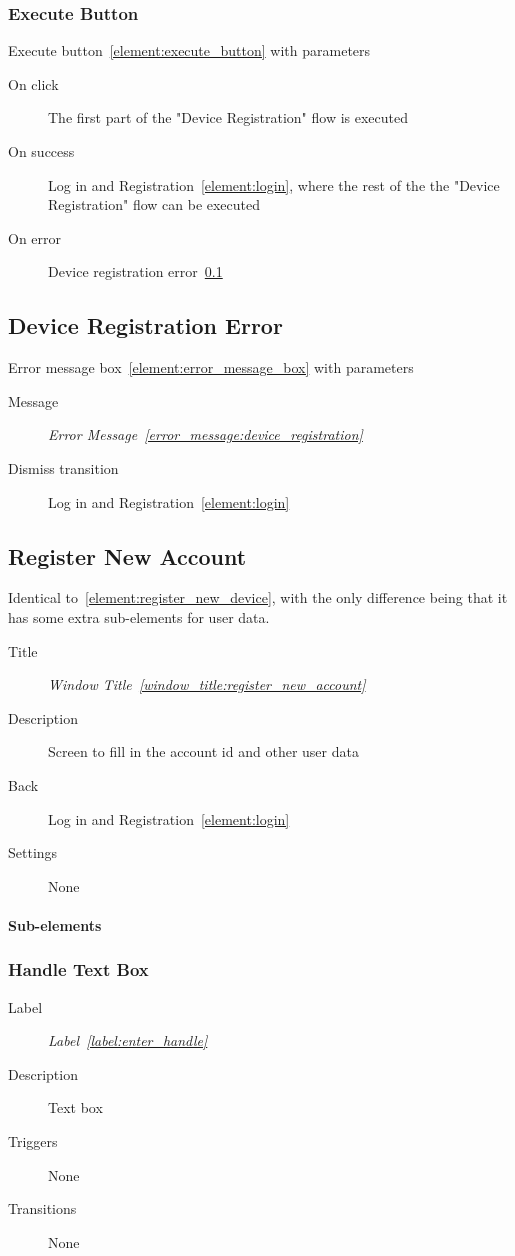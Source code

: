 \documentclass[a4paper,10pt]{article}
\newcommand{\windowTitleLabelText}{Window Title}
\newcommand{\windowTitleLabel}{window_title:}
\DeclareRobustCommand{\windowTitleRef}[1]{%
   \emph{\windowTitleLabelText~\ref{\windowTitleLabel#1}}}
\newcommand{\errorMessageLabelText}{Error Message}
\newcommand{\errorMessageLabel}{error_message:}
\DeclareRobustCommand{\errorMessageTextRef}[1]{%
   \emph{\errorMessageLabelText~\ref{\errorMessageLabel#1}}}
\newcommand{\labelLabelText}{Label}
\newcommand{\labelLabel}{label:}
\DeclareRobustCommand{\labelRef}[1]{%
   \emph{\labelLabelText~\ref{\labelLabel#1}}}
\newcommand{\elementLabel}{element:}
\DeclareRobustCommand{\element}[2]{\subsection{#1}\label{\elementLabel#2}}
\DeclareRobustCommand{\elementRef}[1]{\ref{\elementLabel#1}}
\begin{document}
\subsubsection{Execute Button}
Execute button~\elementRef{execute_button} with parameters
\begin{description}
 \item[On click] The first part of the "Device Registration" flow is executed
 \item[On success] Log in and Registration~\elementRef{login}, where the rest 
of the the "Device Registration" flow can be executed
 \item[On error] Device registration 
error~\elementRef{device_registration_error}
\end{description}

\element{Device Registration Error}{device_registration_error}

Error message box~\elementRef{error_message_box} with parameters
\begin{description}
 \item[Message] \errorMessageTextRef{device_registration}
 \item[Dismiss transition] Log in and Registration~\elementRef{login}
\end{description}

\element{Register New Account}{register_new_account}
Identical to~\elementRef{register_new_device}, with the only difference 
being that it has some extra sub-elements for user data.

\begin{description}
 \item[Title] \windowTitleRef{register_new_account}
 \item[Description] Screen to fill in the account id and other user data
 \item[Back] Log in and Registration~\elementRef{login}
 \item[Settings] None
\end{description}

\paragraph{Sub-elements}

\subsubsection{Handle Text Box}
\begin{description}
 \item[Label] \labelRef{enter_handle}
 \item[Description] Text box
 \item[Triggers] None
 \item[Transitions] None
\end{description}
\end{document}
